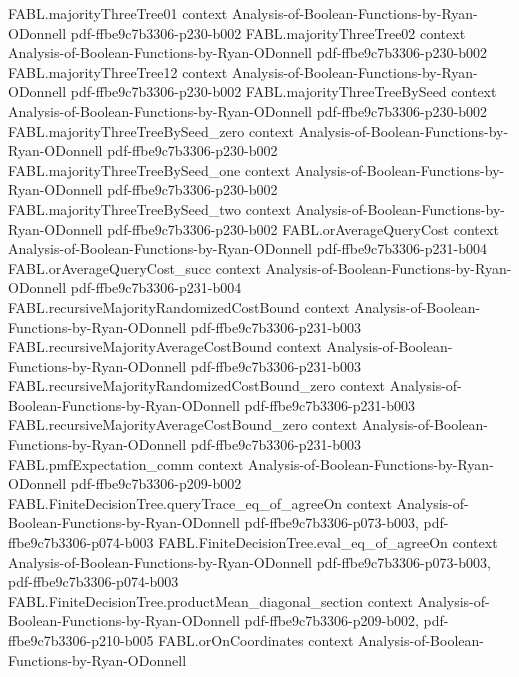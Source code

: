 \begin{theorem}
\proofstep
  {FABL.majorityThreeTree01}
  {context}
  {Analysis-of-Boolean-Functions-by-Ryan-ODonnell}
  {pdf-ffbe9c7b3306-p230-b002}
\proofstep
  {FABL.majorityThreeTree02}
  {context}
  {Analysis-of-Boolean-Functions-by-Ryan-ODonnell}
  {pdf-ffbe9c7b3306-p230-b002}
\proofstep
  {FABL.majorityThreeTree12}
  {context}
  {Analysis-of-Boolean-Functions-by-Ryan-ODonnell}
  {pdf-ffbe9c7b3306-p230-b002}
\proofstep
  {FABL.majorityThreeTreeBySeed}
  {context}
  {Analysis-of-Boolean-Functions-by-Ryan-ODonnell}
  {pdf-ffbe9c7b3306-p230-b002}
\proofstep
  {FABL.majorityThreeTreeBySeed_zero}
  {context}
  {Analysis-of-Boolean-Functions-by-Ryan-ODonnell}
  {pdf-ffbe9c7b3306-p230-b002}
\proofstep
  {FABL.majorityThreeTreeBySeed_one}
  {context}
  {Analysis-of-Boolean-Functions-by-Ryan-ODonnell}
  {pdf-ffbe9c7b3306-p230-b002}
\proofstep
  {FABL.majorityThreeTreeBySeed_two}
  {context}
  {Analysis-of-Boolean-Functions-by-Ryan-ODonnell}
  {pdf-ffbe9c7b3306-p230-b002}
\proofstep
  {FABL.orAverageQueryCost}
  {context}
  {Analysis-of-Boolean-Functions-by-Ryan-ODonnell}
  {pdf-ffbe9c7b3306-p231-b004}
\proofstep
  {FABL.orAverageQueryCost_succ}
  {context}
  {Analysis-of-Boolean-Functions-by-Ryan-ODonnell}
  {pdf-ffbe9c7b3306-p231-b004}
\proofstep
  {FABL.recursiveMajorityRandomizedCostBound}
  {context}
  {Analysis-of-Boolean-Functions-by-Ryan-ODonnell}
  {pdf-ffbe9c7b3306-p231-b003}
\proofstep
  {FABL.recursiveMajorityAverageCostBound}
  {context}
  {Analysis-of-Boolean-Functions-by-Ryan-ODonnell}
  {pdf-ffbe9c7b3306-p231-b003}
\proofstep
  {FABL.recursiveMajorityRandomizedCostBound_zero}
  {context}
  {Analysis-of-Boolean-Functions-by-Ryan-ODonnell}
  {pdf-ffbe9c7b3306-p231-b003}
\proofstep
  {FABL.recursiveMajorityAverageCostBound_zero}
  {context}
  {Analysis-of-Boolean-Functions-by-Ryan-ODonnell}
  {pdf-ffbe9c7b3306-p231-b003}
\proofstep
  {FABL.pmfExpectation_comm}
  {context}
  {Analysis-of-Boolean-Functions-by-Ryan-ODonnell}
  {pdf-ffbe9c7b3306-p209-b002}
\proofstep
  {FABL.FiniteDecisionTree.queryTrace_eq_of_agreeOn}
  {context}
  {Analysis-of-Boolean-Functions-by-Ryan-ODonnell}
  {pdf-ffbe9c7b3306-p073-b003,
    pdf-ffbe9c7b3306-p074-b003}
\proofstep
  {FABL.FiniteDecisionTree.eval_eq_of_agreeOn}
  {context}
  {Analysis-of-Boolean-Functions-by-Ryan-ODonnell}
  {pdf-ffbe9c7b3306-p073-b003,
    pdf-ffbe9c7b3306-p074-b003}
\proofstep
  {FABL.FiniteDecisionTree.productMean_diagonal_section}
  {context}
  {Analysis-of-Boolean-Functions-by-Ryan-ODonnell}
  {pdf-ffbe9c7b3306-p209-b002,
    pdf-ffbe9c7b3306-p210-b005}
\proofstep
  {FABL.orOnCoordinates}
  {context}
  {Analysis-of-Boolean-Functions-by-Ryan-ODonnell}

\end{theorem}
